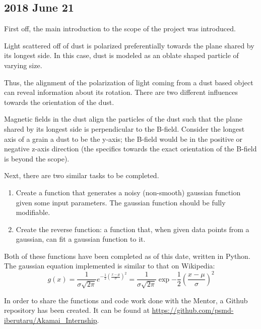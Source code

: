 \documentclass[twocolumn]{article}
\begin{document}
\subsection{2018 June 21}
\label{subsec:2018_June_6}

\begin{meetingnotes*}
	First off, the main introduction to the scope of the project was introduced.

	Light scattered off of dust is polarized preferentially towards the plane shared by its longest side. In this case, dust is modeled as an oblate shaped particle of varying size.

	Thus, the alignment of the polarization of light coming from a dust based object can reveal information about its rotation. There are two different influences towards the orientation of the dust. 

	Magnetic fields in the dust align the particles of the dust such that the plane shared by its longest side is perpendicular to the B-field. Consider the longest axis of a grain a dust to be the y-axis; the B-field would be in the positive or negative z-axis direction (the specifics towards the exact orientation of the B-field is beyond the scope).

	Next, there are two similar tasks to be completed.
	\begin{enumerate}
		\item Create a function that generates a noisy (non-smooth) gaussian function given some input parameters. The gaussian function should be fully modifiable. 
		\item Create the reverse function: a function that, when given data points from a gaussian, can fit a gaussian function to it.
	\end{enumerate}
\end{meetingnotes*}

Both of these functions have been completed as of this date, written in Python. The gaussian equation implemented is similar to that on Wikipedia:
\begin{equation}
	g(x) = \frac{1}{\sigma \sqrt{2 \pi}} e^{ -\frac{1}{2} \left(\frac{x-\mu}{\sigma}\right)^2 } = \frac{1}{\sigma \sqrt{2 \pi}} \exp{ -\frac{1}{2} \left(\frac{x-\mu}{\sigma}\right)^2 }
	\label{eq:gaussian_probability_distribution}
\end{equation}

In order to share the functions and code work done with the Mentor, a Github repository has been created. It can be found at \url{https://github.com/psmd-iberutaru/Akamai_Internship}.
\end{document}
